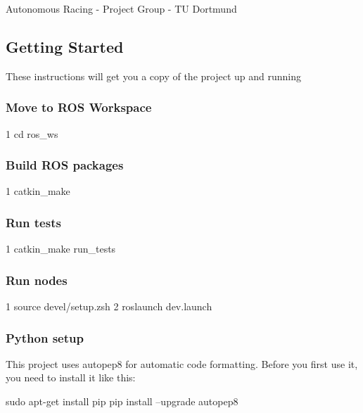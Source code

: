 Autonomous Racing -\/ Project Group -\/ TU Dortmund

\href{https://travis-ci.com/Autonomous-Racing-PG/ros.package}{\tt }

\subsection*{Getting Started}

These instructions will get you a copy of the project up and running

\subsubsection*{Move to R\+OS Workspace}


\begin{DoxyCode}
1 cd ros\_ws
\end{DoxyCode}


\subsubsection*{Build R\+OS packages}


\begin{DoxyCode}
1 catkin\_make
\end{DoxyCode}


\subsubsection*{Run tests}


\begin{DoxyCode}
1 catkin\_make run\_tests
\end{DoxyCode}


\subsubsection*{Run nodes}


\begin{DoxyCode}
1 source devel/setup.zsh
2 roslaunch dev.launch
\end{DoxyCode}


\subsubsection*{Python setup}

This project uses {\ttfamily autopep8} for automatic code formatting. Before you first use it, you need to install it like this\+: \begin{DoxyVerb}sudo apt-get install pip
pip install --upgrade autopep8
\end{DoxyVerb}


